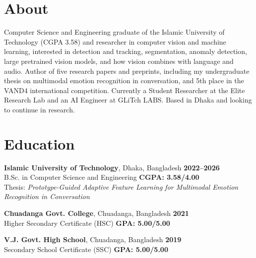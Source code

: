 \documentclass{resume}
\renewenvironment{rSection}[1]{
  \Needspace{3\baselineskip}%
  \section{#1}
  \begin{list}{}{
      \setlength{\leftmargin}{0.2em}
  }
  \item[]
}{
  \end{list}
  \vspace{0pt}
}
\begin{document}
\fontsize{11.5pt}{14pt}\selectfont

\begin{rSection}{About}
Computer Science and Engineering graduate of the Islamic University of Technology (CGPA 3.58) and researcher in computer vision and machine learning, interested in detection and tracking, segmentation, anomaly detection, large pretrained vision models, and how vision combines with language and audio. Author of five research papers and preprints, including my undergraduate thesis on multimodal emotion recognition in conversation, and 5th place in the VAND4 international competition. Currently a Student Researcher at the Elite Research Lab and an AI Engineer at GLiTch LABS. Based in Dhaka and looking to continue in research.
\end{rSection}

\begin{rSection}{Education}
\textbf{Islamic University of Technology}, Dhaka, Bangladesh \hfill \textbf{2022--2026} \\
B.Sc. in Computer Science and Engineering \hfill \textbf{CGPA: 3.58/4.00} \\
Thesis: \emph{Prototype-Guided Adaptive Feature Learning for Multimodal Emotion Recognition in Conversation} 

\textbf{Chuadanga Govt. College}, Chuadanga, Bangladesh \hfill \textbf{2021} \\
Higher Secondary Certificate (HSC) \hfill \textbf{GPA: 5.00/5.00}

\textbf{V.J. Govt. High School}, Chuadanga, Bangladesh \hfill \textbf{2019} \\
Secondary School Certificate (SSC) \hfill \textbf{GPA: 5.00/5.00}
\end{rSection}
\end{document}
